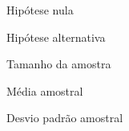 
\begin{simbolos}
  \item[$ H_0 $] Hipótese nula
  \item[$ H_1 $] Hipótese alternativa
  \item[$ n $] Tamanho da amostra
  \item[$ \bar{x} $] Média amostral
  \item[$ s $] Desvio padrão amostral
\end{simbolos}
